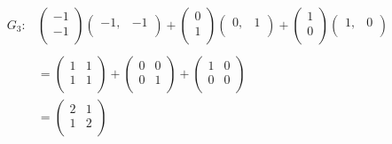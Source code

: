 \documentclass[11pt,a4paper]{article}
\theoremstyle{definition}
\begin{document}
\begin{align*}
G_3: & \begin{pmatrix}
-1\\-1\\
\end{pmatrix}
\begin{pmatrix}
-1, & -1\\
\end{pmatrix} + \begin{pmatrix}
0\\ 1\\
\end{pmatrix}
\begin{pmatrix}
0, & 1\\
\end{pmatrix} + \begin{pmatrix}
1\\0\\
\end{pmatrix}
\begin{pmatrix}
1, & 0\\
\end{pmatrix}\\\\
& = \begin{pmatrix}
1 & 1\\
1 & 1\\
\end{pmatrix} + \begin{pmatrix}
0 & 0\\
0 & 1\\
\end{pmatrix} + \begin{pmatrix}
1 & 0\\
0 & 0\\
\end{pmatrix}\\
& = \begin{pmatrix}
2 & 1\\
1 & 2\\
\end{pmatrix}\\
\end{align*}
\end{document}
